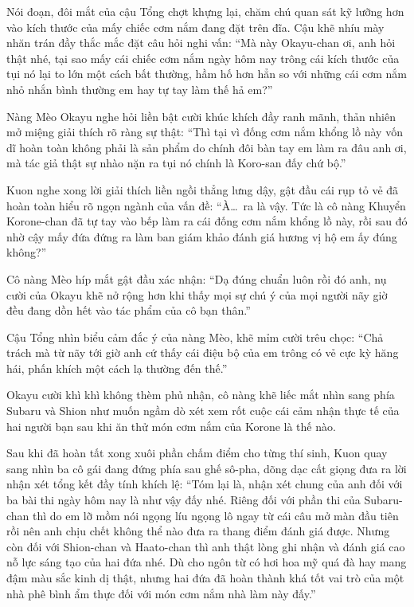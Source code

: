 \documentclass[../main.tex]{subfiles}
\begin{document}
Nói đoạn, đôi mắt của cậu Tổng chợt khựng lại, chăm chú quan sát kỹ lưỡng hơn vào kích thước của mấy chiếc cơm nắm đang đặt trên đĩa. Cậu khẽ nhíu mày nhăn trán đầy thắc mắc đặt câu hỏi nghi vấn: ``Mà này Okayu-chan ơi, anh hỏi thật nhé, tại sao mấy cái chiếc cơm nắm ngày hôm nay trông cái kích thước của tụi nó lại to lớn một cách bất thường, hầm hố hơn hẳn so với những cái cơm nắm nhỏ nhắn bình thường em hay tự tay làm thế hả em?''

Nàng Mèo Okayu nghe hỏi liền bật cười khúc khích đầy ranh mãnh, thản nhiên mở miệng giải thích rõ ràng sự thật: ``Thì tại vì đống cơm nắm khổng lồ này vốn dĩ hoàn toàn không phải là sản phẩm do chính đôi bàn tay em làm ra đâu anh ơi, mà tác giả thật sự nhào nặn ra tụi nó chính là Koro-san đấy chứ bộ.''


Kuon nghe xong lời giải thích liền ngồi thẳng lưng dậy, gật đầu cái rụp tỏ vẻ đã hoàn toàn hiểu rõ ngọn ngành của vấn đề: ``À\dots\ ra là vậy. Tức là cô nàng Khuyển Korone-chan đã tự tay vào bếp làm ra cái đống cơm nắm khổng lồ này, rồi sau đó nhờ cậy mấy đứa đứng ra làm ban giám khảo đánh giá hương vị hộ em ấy đúng không?''

Cô nàng Mèo híp mắt gật đầu xác nhận: ``Dạ đúng chuẩn luôn rồi đó anh, nụ cười của Okayu khẽ nở rộng hơn khi thấy mọi sự chú ý của mọi người nãy giờ đều đang dồn hết vào tác phẩm của cô bạn thân.''

Cậu Tổng nhìn biểu cảm đắc ý của nàng Mèo, khẽ mỉm cười trêu chọc: ``Chả trách mà từ nãy tới giờ anh cứ thấy cái điệu bộ của em trông có vẻ cực kỳ hăng hái, phấn khích một cách lạ thường đến thế.''

Okayu cười khì khì không thèm phủ nhận, cô nàng khẽ liếc mắt nhìn sang phía Subaru và Shion như muốn ngầm dò xét xem rốt cuộc cái cảm nhận thực tế của hai người bạn sau khi ăn thử món cơm nắm của Korone là thế nào.

Sau khi đã hoàn tất xong xuôi phần chấm điểm cho từng thí sinh, Kuon quay sang nhìn ba cô gái đang đứng phía sau ghế sô-pha, dõng dạc cất giọng đưa ra lời nhận xét tổng kết đầy tính khích lệ: ``Tóm lại là, nhận xét chung của anh đối với ba bài thi ngày hôm nay là như vậy đấy nhé. Riêng đối với phần thi của Subaru-chan thì do em lỡ mồm nói ngọng líu ngọng lô ngay từ cái câu mở màn đầu tiên rồi nên anh chịu chết không thể nào đưa ra thang điểm đánh giá được. Nhưng còn đối với Shion-chan và Haato-chan thì anh thật lòng ghi nhận và đánh giá cao nỗ lực sáng tạo của hai đứa nhé. Dù cho ngôn từ có hơi hoa mỹ quá đà hay mang đậm màu sắc kinh dị thật, nhưng hai đứa đã hoàn thành khá tốt vai trò của một nhà phê bình ẩm thực đối với món cơm nắm nhà làm này đấy.''
\end{document}
